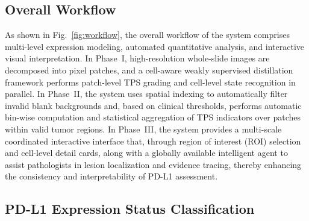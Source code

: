 \documentclass[journal]{vgtc}                     %
\begin{document}
\subsection{Overall Workflow}
As shown in Fig.~\ref{fig:workflow}, the overall workflow of the system comprises multi-level expression modeling, automated quantitative analysis, and interactive visual interpretation. In Phase~I, high-resolution whole-slide images are decomposed into pixel patches, and a cell-aware weakly supervised distillation framework performs patch-level TPS grading and cell-level state recognition in parallel. In Phase~II, the system uses spatial indexing to automatically filter invalid blank backgrounds and, based on clinical thresholds, performs automatic bin-wise computation and statistical aggregation of TPS indicators over patches within valid tumor regions. In Phase~III, the system provides a multi-scale coordinated interactive interface that, through region of interest (ROI) selection and cell-level detail cards, along with a globally available intelligent agent to assist pathologists in lesion localization and evidence tracing, thereby enhancing the consistency and interpretability of PD-L1 assessment.

\subsection{PD-L1 Expression Status Classification}
\end{document}
